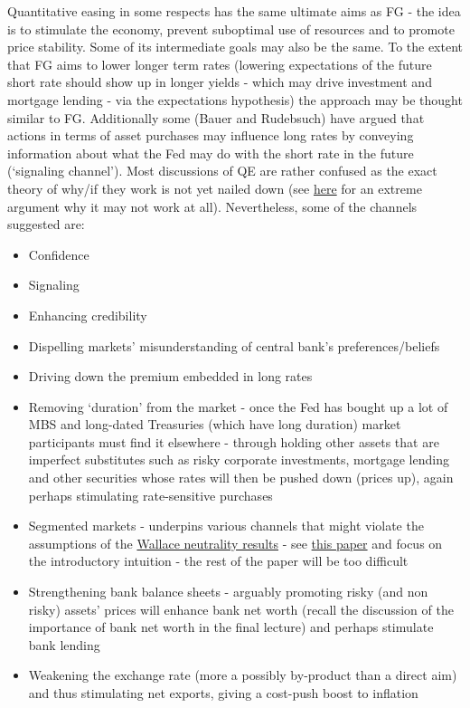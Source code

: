 \documentclass[authoryear,11pt]{elsarticle}
\begin{document}
Quantitative easing in some respects has the same ultimate aims as FG - the idea is to stimulate the economy, prevent suboptimal use of resources and to promote price stability. Some of its intermediate goals may also be the same. To the extent that FG aims to lower longer term rates (lowering expectations of the future short rate should show up in longer yields - which may drive investment and mortgage lending - via the expectations hypothesis) the approach may be thought similar to FG. Additionally some (Bauer and Rudebsuch) have argued that actions in terms of asset purchases may influence long rates by conveying information about what the Fed may do with the short rate in the future (`signaling channel'). Most discussions of QE are rather confused as the exact theory of why/if they work is not yet nailed down (see \href{https://en.wikipedia.org/wiki/Wallace_neutrality}{here} for an extreme argument why it may not work at all). Nevertheless, some of the channels suggested are:
\begin{itemize}
\item	Confidence
\item	Signaling
\item	Enhancing credibility
\item	Dispelling markets' misunderstanding of central bank's preferences/beliefs
\item	Driving down the premium embedded in long rates
\item	Removing `duration' from the market - once the Fed has bought up a lot of MBS and long-dated Treasuries (which have long duration) market participants must find it elsewhere - through holding other assets that are imperfect substitutes such as risky corporate investments, mortgage lending and other securities whose rates will then be pushed down (prices up), again perhaps stimulating rate-sensitive purchases
\item	Segmented markets - underpins various channels that might violate the assumptions of the \href{Wallace neutrality}{Wallace neutrality results} - see \href{https://personal.lse.ac.uk/vayanos/WPapers/PHMTSIR.pdf}{this paper} and focus on the introductory intuition - the rest of the paper will be too difficult
\item	Strengthening bank balance sheets - arguably promoting risky (and non risky) assets' prices will enhance bank net worth (recall the discussion of the importance of bank net worth in the final lecture) and perhaps stimulate bank lending
\item	Weakening the exchange rate (more a possibly by-product than a direct aim) and thus stimulating net exports, giving a cost-push boost to inflation
\end{itemize}
\end{document}
